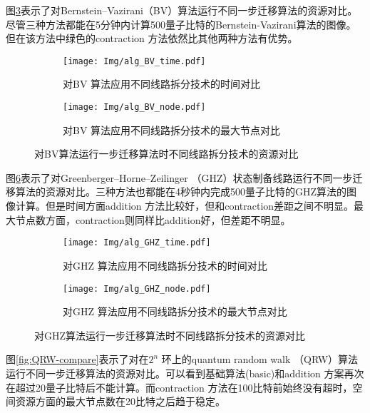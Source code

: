 图\ref{fig:BV-compare}表示了对Bernstein–Vazirani（BV）算法运行不同一步迁移算法的资源对比。尽管三种方法都能在5分钟内计算500量子比特的Bernstein-Vazirani算法的图像。但在该方法中绿色的contraction 方法依然比其他两种方法有优势。
\begin{figure}[!htbp]
    \centering
    \begin{subfigure}[b]{.45\textwidth}
        \centering
        \texttt{[image: Img/alg\_BV\_time.pdf]}
        \caption{对BV 算法应用不同线路拆分技术的时间对比}
        \label{fig:BV-time}
    \end{subfigure}
    \qquad
    \begin{subfigure}[b]{.45\textwidth}
        \centering
        \texttt{[image: Img/alg\_BV\_node.pdf]}
        \caption{对BV 算法应用不同线路拆分技术的最大节点对比}
        \label{fig:BV-node}
    \end{subfigure}
    \caption{对BV算法运行一步迁移算法时不同线路拆分技术的资源对比}
    \label{fig:BV-compare}
\end{figure}

图\ref{fig:GHZ-compare}表示了对Greenberger–Horne–Zeilinger （GHZ）状态制备线路运行不同一步迁移算法的资源对比。三种方法也都能在4秒钟内完成500量子比特的GHZ算法的图像计算。但是时间方面addition 方法比较好，但和contraction差距之间不明显。最大节点数方面，contraction则同样比addition好，但差距不明显。
\begin{figure}[!htbp]
    \centering
    \begin{subfigure}[b]{.45\textwidth}
        \centering
        \texttt{[image: Img/alg\_GHZ\_time.pdf]}
        \caption{对GHZ 算法应用不同线路拆分技术的时间对比}
        \label{fig:GHZ-time}
    \end{subfigure}
    \qquad
    \begin{subfigure}[b]{.45\textwidth}
        \centering
        \texttt{[image: Img/alg\_GHZ\_node.pdf]}
        \caption{对GHZ 算法应用不同线路拆分技术的最大节点对比}
        \label{fig:GHZ-node}
    \end{subfigure}
    \caption{对GHZ算法运行一步迁移算法时不同线路拆分技术的资源对比}
    \label{fig:GHZ-compare}
\end{figure}

图\ref{fig:QRW-compare}表示了对在$2^n$ 环上的quantum random walk （QRW）算法运行不同一步迁移算法的资源对比。可以看到基础算法(basic)和addition 方案再次在超过20量子比特后不能计算。而contraction 方法在100比特前始终没有超时，空间资源方面的最大节点数在20比特之后趋于稳定。

